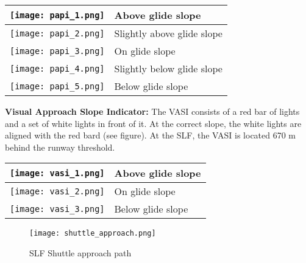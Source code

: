 \documentclass[Orbiter User Manual.tex]{subfiles}
\begin{document}
	\begin{longtable}{ |p{} p{}| }
	\hline\rule{0pt}{2ex}
	\texttt{[image: papi\_1.png]} & Above glide slope\\
	\hline\rule{0pt}{2ex}
	\texttt{[image: papi\_2.png]} & Slightly above glide slope\\
	\hline\rule{0pt}{2ex}
	\texttt{[image: papi\_3.png]} & On glide slope\\
	\hline\rule{0pt}{2ex}
	\texttt{[image: papi\_4.png]} & Slightly below glide slope\\
	\hline\rule{0pt}{2ex}
	\texttt{[image: papi\_5.png]} & Below glide slope\\
	\hline
	\end{longtable}

\noindent
\textbf{Visual Approach Slope Indicator:} The VASI consists of a red bar of lights and a set of white lights in front of it. At the correct slope, the white lights are aligned with the red bard (see figure). At the SLF, the VASI is located 670 m behind the runway threshold.

	\begin{longtable}{ |p{} p{}| }
	\hline\rule{0pt}{2ex}
	\texttt{[image: vasi\_1.png]} & Above glide slope\\
	\hline\rule{0pt}{2ex}
	\texttt{[image: vasi\_2.png]} & On glide slope\\
	\hline\rule{0pt}{2ex}
	\texttt{[image: vasi\_3.png]} & Below glide slope\\
	\hline
	\end{longtable}

\begin{figure}[H]
	\centering
	\texttt{[image: shuttle\_approach.png]}
	\caption{SLF Shuttle approach path}
\end{figure}
\end{document}
